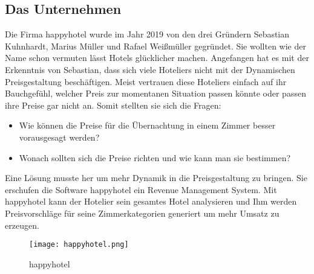 \subsection{Das Unternehmen}
\label{subsec:Unternehmen}
Die Firma happyhotel wurde im Jahr 2019 von den drei Gründern Sebastian Kuhnhardt, Marius Müller und Rafael Weißmüller gegründet. Sie wollten wie der Name schon vermuten lässt Hotels glücklicher machen. Angefangen hat es mit der Erkenntnis von Sebastian,  dass sich viele Hoteliers nicht mit der Dynamischen Preisgestaltung beschäftigen. Meist vertrauen diese Hoteliers einfach auf ihr Bauchgefühl, welcher Preis zur momentanen Situation passen könnte oder passen ihre Preise gar nicht an. 
\newline
\newline
Somit stellten sie sich die Fragen: 
\begin{itemize}
    \item Wie können die Preise für die Übernachtung in einem Zimmer besser vorausgesagt werden?
    \item Wonach sollten sich die Preise richten und wie kann man sie bestimmen?
\end{itemize}

Eine Lösung musste her um mehr Dynamik in die Preisgestaltung zu bringen. Sie erschufen die Software happyhotel ein Revenue Management System. Mit happyhotel kann der Hotelier sein gesamtes Hotel analysieren und Ihm werden Preisvorschläge für seine Zimmerkategorien generiert um mehr Umsatz zu erzeugen.
\begin{figure}[h]
    \centering
    \texttt{[image: happyhotel.png]}
    \caption[happyhotel]{happyhotel}
    \label{img:happyhotel}
\end{figure}
